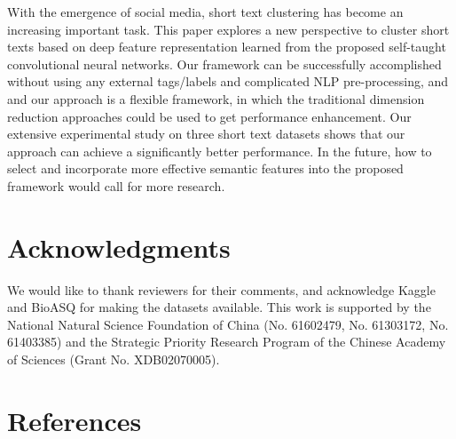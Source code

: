 \documentclass[review]{elsarticle}
\begin{document}
With the emergence of social media, short text clustering has become an increasing important task. This paper explores a new perspective to cluster short texts based on deep feature representation learned from the proposed self-taught convolutional neural networks. Our framework can be successfully accomplished without using any external tags/labels and complicated NLP pre-processing, and and our approach is a flexible framework, in which the traditional dimension reduction approaches could be used to get performance enhancement. Our extensive experimental study on three short text datasets shows that our approach can achieve a significantly better performance. In the future, how to select and incorporate more effective semantic features into the proposed framework would call for more research.


\section*{Acknowledgments}
We would like to thank reviewers for their comments, and acknowledge Kaggle and BioASQ for making the datasets available. This work is supported by the National Natural Science Foundation of China (No. 61602479, No. 61303172, No. 61403385) and the Strategic Priority Research Program of the Chinese Academy of Sciences (Grant No. XDB02070005).

\section*{References}


\end{document}
